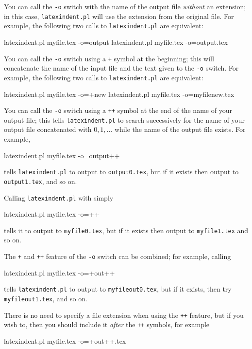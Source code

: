 	You can call the \texttt{-o} switch with the name of the output file \emph{without} an
	extension; in  this case,
	\texttt{latexindent.pl} will use the extension from the original file. For example, the
	following two calls to \texttt{latexindent.pl} are equivalent:%
	\begin{commandshell}
latexindent.pl myfile.tex -o=output
latexindent.pl myfile.tex -o=output.tex
\end{commandshell}

	You can call the \texttt{-o} switch using a \texttt{+} symbol at the beginning; this will
	 concatenate the name of the input file and the
	text given to the \texttt{-o} switch. For example, the following two calls to
	\texttt{latexindent.pl} are equivalent:%
	\begin{commandshell}
latexindent.pl myfile.tex -o=+new
latexindent.pl myfile.tex -o=myfilenew.tex
\end{commandshell}

	You can call the \texttt{-o} switch using a \texttt{++} symbol at the end of the name
	 of your output file; this tells
	\texttt{latexindent.pl} to search successively for the name of your output file
	concatenated with $0, 1, \ldots$ while the name of the output file exists. For example,%
	\begin{commandshell}
latexindent.pl myfile.tex -o=output++
\end{commandshell}
	tells \texttt{latexindent.pl} to output to \texttt{output0.tex}, but if it exists then
	output to \texttt{output1.tex}, and so on.

	Calling \texttt{latexindent.pl} with simply
	\begin{commandshell}
latexindent.pl myfile.tex -o=++
\end{commandshell}
	tells it to output to \texttt{myfile0.tex}, but if it exists then output to
	\texttt{myfile1.tex} and so on.

	The \texttt{+} and \texttt{++} feature of the \texttt{-o} switch can be combined; for
	example, calling
	\begin{commandshell}
latexindent.pl myfile.tex -o=+out++
\end{commandshell}
	tells \texttt{latexindent.pl} to output to \texttt{myfileout0.tex}, but if it exists,
	then try \texttt{myfileout1.tex}, and so on.

	There is no need to specify a file extension when using the \texttt{++} feature, but if
	you wish to, then you should include it \emph{after} the \texttt{++} symbols, for example
	\begin{commandshell}
latexindent.pl myfile.tex -o=+out++.tex
\end{commandshell}

